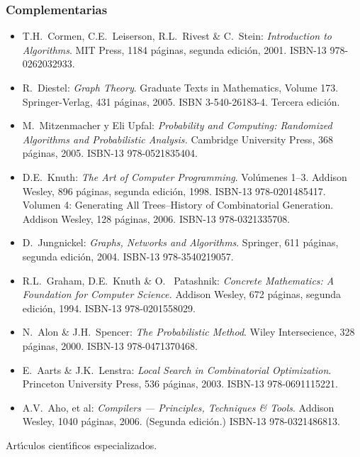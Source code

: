 \subsubsection{Complementarias}

\begin{itemize}[itemsep=-1pt]
  
\item T.H.\ {\sc Cormen}, C.E.\ {\sc Leiserson}, R.L.\ Rivest \&
  C.\ {\sc Stein}: {\em Introduction to Algorithms}. MIT Press,
  1184 p\'{a}ginas, segunda edici\'{o}n, 2001. ISBN-13
  978-0262032933.
  
\item R.\ {\sc Diestel}: {\em Graph Theory}. Graduate Texts in
  Mathematics, Volume 173. Springer-Verlag, 431 p\'{a}ginas,
  2005. ISBN 3-540-26183-4. Tercera edici\'{o}n.
  
\item M.\ {\sc Mitzenmacher} y Eli {\sc Upfal}: {\em
    Probability and Computing: Randomized Algorithms and
    Probabilistic Analysis.}  Cambridge University Press, 368
  p\'{a}ginas, 2005. ISBN-13 978-0521835404.
  
\item D.E.\ {\sc Knuth}: {\em The Art of Computer
    Programming}. Vol\'{u}menes 1--3. Addison Wesley, 896
  p\'{a}ginas, segunda edici\'{o}n, 1998. ISBN-13
  978-0201485417. Volumen 4: Generating All Trees--History of
  Combinatorial Generation. Addison Wesley, 128 p\'{a}ginas,
  2006. ISBN-13 978-0321335708.
  
\item D.\ {\sc Jungnickel}: {\em Graphs, Networks and
    Algorithms}. Springer, 611 p\'{a}ginas, segunda edici\'{o}n,
  2004. ISBN-13 978-3540219057.
  
\item R.L.\ {\sc Graham}, D.E.\ {\sc Knuth} \& O.\ {\sc
    Patashnik}: {\em Concrete Mathematics: A Foundation for
    Computer
    Science.} Addison Wesley, 672 p\'{a}ginas, segunda edici\'{o}n,
  1994. ISBN-13 978-0201558029.
  
\item N.\ {\sc Alon} \& J.H.\ {\sc Spencer}: {\em The
    Probabilistic Method}. Wiley Intersecience, 328 p\'{a}ginas,
  2000. ISBN-13 978-0471370468.
  
\item E.\ {\sc Aarts} \& J.K.\ {\sc Lenstra}: {\em Local
    Search
    in Combinatorial Optimization}. Princeton University
  Press, 536
  p\'{a}ginas, 2003. ISBN-13 978-0691115221.
  
\item A.V.\ {\sc Aho}, et al: {\em Compilers ---
    Principles,
    Techniques \& Tools}. Addison Wesley, 1040
  p\'{a}ginas, 2006. (Segunda
  edici\'{o}n.) ISBN-13 978-0321486813.
  
\end{itemize}
 
Art\'{\i}culos cient\'{\i}ficos especializados.

\label{final} %


